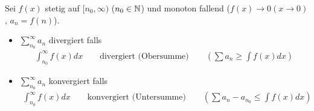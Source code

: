 \documentclass[a4paper]{article}
\begin{document}
	
	\begin{fdef}
		Sei $f(x)$ stetig auf $[n_0, \infty)$ ($n_0 \in \mathbb{N}$) und monoton fallend ($f(x) \rightarrow 0 (x \rightarrow 0)$, $a_n = f(n)$). 
		\begin{itemize}
		 \item $\sum_{n_0}^\infty a_n$ divergiert falls
			\begin{align*}
				\int_{n_0}^\infty f(x) dx \qquad \text{divergiert (Obersumme)} \qquad \left( \sum a_n \geq \int f(x) dx \right)
			\end{align*}
		 \item $\sum_{n_0}^\infty a_n$ konvergiert falls
			\begin{align*}
				\int_{n_0}^\infty f(x) dx \qquad \text{konvergiert (Untersumme)} \qquad \left( \sum a_n - a_{n_0}\leq \int f(x) dx \right)
			\end{align*}
		\end{itemize}

	\end{fdef}
\end{document}
